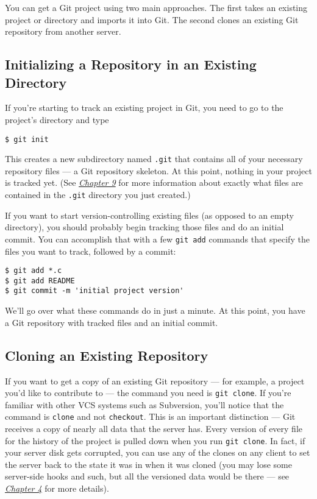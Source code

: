 \documentclass[a4paper]{book}
\newcommand{\prechap}{Chapter }
\newcommand{\postchap}{}
\newcommand{\chapref}[1]{\hyperref[chap:#1]{\prechap #1\postchap}}
\begin{document}
You can get a Git project using two main approaches. The first takes an existing project or directory and imports it into Git. The second clones an existing Git repository from another server.

\subsection{Initializing a Repository in an Existing Directory}

If you're starting to track an existing project in Git, you need to go to the project's directory and type

\begin{shaded}\begin{verbatim}
$ git init
\end{verbatim}\end{shaded}

This creates a new subdirectory named \texttt{.git} that contains all of your necessary repository files --- a Git repository skeleton. At this point, nothing in your project is tracked yet. (See \emph{\chapref{9}} for more information about exactly what files are contained in the \texttt{.git} directory you just created.)

If you want to start version-controlling existing files (as opposed to an empty directory), you should probably begin tracking those files and do an initial commit. You can accomplish that with a few \texttt{git add} commands that specify the files you want to track, followed by a commit:

\begin{shaded}\begin{verbatim}
$ git add *.c
$ git add README
$ git commit -m 'initial project version'
\end{verbatim}\end{shaded}

We'll go over what these commands do in just a minute. At this point, you have a Git repository with tracked files and an initial commit.

\subsection{Cloning an Existing Repository}

If you want to get a copy of an existing Git repository --- for example, a project you'd like to contribute to --- the command you need is \texttt{git clone}. If you're familiar with other VCS systems such as Subversion, you'll notice that the command is \texttt{clone} and not \texttt{checkout}. This is an important distinction --- Git receives a copy of nearly all data that the server has. Every version of every file for the history of the project is pulled down when you run \texttt{git clone}. In fact, if your server disk gets corrupted, you can use any of the clones on any client to set the server back to the state it was in when it was cloned (you may lose some server-side hooks and such, but all the versioned data would be there --- see \emph{\chapref{4}} for more details).
\end{document}

